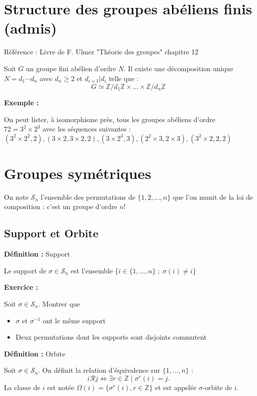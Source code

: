 \documentclass{report}
\newenvironment{definition}[1][]{
    \begin{tcolorbox}[colframe= white]
    \textbf{Définition :} 
    #1 \par
    }
    {\end{tcolorbox}}
\newenvironment{exemple}{\begin{tcolorbox}[colback=gray!10,colframe= white]
    \textbf{Exemple :}
     \par}
    {\end{tcolorbox}}
\newenvironment{exo}{\begin{tcolorbox}[colframe= white]
    \textbf{Exercice :}
    \par}
    {\end{tcolorbox}}
\newcommand{\Z}{\mathbb{Z}}
\newcommand{\sn}{\mathcal{S}_{n}}
\newcommand{\unn}{\{1, ..., n\}}
\begin{document}
\section{Structure des groupes abéliens finis (admis)}
Référence : Livre de F. Ulmer "Théorie des groupes" chapitre 12


Soit $G$ un groupe fini abélien d'ordre $N$. Il existe une décomposition unique $N=d_1 \cdots d_n$ avec $d_n \geq 2$ et $d_{i+1} | d_i$ telle que : $$G \simeq \mathbb{Z}/d_1\mathbb{Z} \times \dots \times \mathbb{Z}/d_n\mathbb{Z}$$

\begin{exemple}
	On peut lister, à isomorphisme près, tous les groupes abéliens d'ordre $72=3^2 \times 2^3$ avec les séquences suivantes : $(3^2 \times 2^2, 2) , (3\times 2, 3\times 2, 2), (3\times 2^3, 3), (2^2\times 3, 2\times 3), (3^2\times 2,2,2)$
\end{exemple}

\section{Groupes symétriques}
On note $\sn$  l'ensemble des permutations de $\{1, 2, ..., n\}$ que l'on munit de la loi de composition : c'est un groupe d'ordre $n!$

\subsection{Support et Orbite}
\begin{definition}[Support]
Le support de $\sigma \in \sn$ est l'ensemble $\{i\in\unn\; ; \; \sigma(i)\neq i\}$
\end{definition}

\begin{exo}
Soit $\sigma\in\sn$. Montrer que
\begin{itemize}[label=$\bullet$]
\item $\sigma$ et $\sigma^{-1}$ ont le même support
\item Deux permutations dont les supports sont disjoints commutent
\end{itemize}
\end{exo}

\begin{definition}[Orbite]
Soit $\sigma\in\sn$. On définit la relation d'équivalence sur $\unn$ : \[i\mathcal{R}j \Longleftrightarrow \exists r\in\Z \;|\;\sigma^r(i)=j.\]
La classe de $i$ est notée $\Omega(i) = \{\sigma^r(i), r\in\Z\}$ et est appelée $\sigma$-orbite de $i$.
\end{definition}
\end{document}

